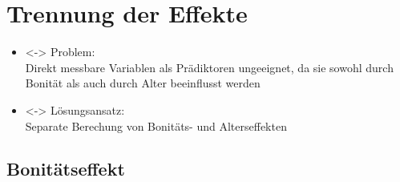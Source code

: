 \section{Trennung der Effekte}
\begin{frame}[c]

  \begin{itemize}
  \item<\theFirstElement-> Problem: \\
    Direkt messbare Variablen als Prädiktoren ungeeignet, da sie sowohl durch Bonität als auch durch Alter beeinflusst werden
  \item<\theFirstElement-> Lösungsansatz: \\
    Separate Berechung von Bonitäts- und Alterseffekten
  \end{itemize}


\end{frame}

\subsection{Bonitätseffekt}

